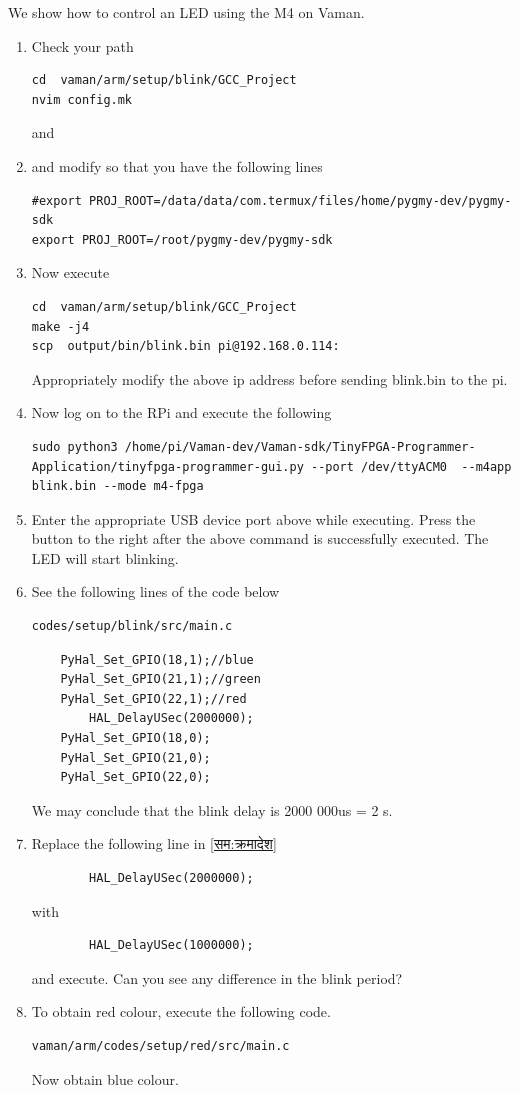 We show how to control an LED using the M4 on Vaman.
\begin{enumerate}[label=\arabic*.,ref=\theenumi]
\item Check your path
\begin{lstlisting}
cd  vaman/arm/setup/blink/GCC_Project
nvim config.mk
\end{lstlisting}
and
\item and modify so that you have the following lines
\begin{lstlisting}
#export PROJ_ROOT=/data/data/com.termux/files/home/pygmy-dev/pygmy-sdk
export PROJ_ROOT=/root/pygmy-dev/pygmy-sdk
\end{lstlisting}
\item Now execute 
\begin{lstlisting}
cd  vaman/arm/setup/blink/GCC_Project
make -j4
scp  output/bin/blink.bin pi@192.168.0.114:
\end{lstlisting}
Appropriately modify the above ip address before sending blink.bin to the pi.
\item Now log on to the RPi and execute the following
\begin{lstlisting}
sudo python3 /home/pi/Vaman-dev/Vaman-sdk/TinyFPGA-Programmer-Application/tinyfpga-programmer-gui.py --port /dev/ttyACM0  --m4app  blink.bin --mode m4-fpga
\end{lstlisting}
\item Enter the appropriate USB device port above while executing.  Press the button to the right
after the above command is successfully executed.  The LED will start blinking. 
\item See the following lines of the code below
\label{सम:क्रमादेश}
\begin{lstlisting}
codes/setup/blink/src/main.c
\end{lstlisting}
%
\begin{lstlisting}
    PyHal_Set_GPIO(18,1);//blue
    PyHal_Set_GPIO(21,1);//green
    PyHal_Set_GPIO(22,1);//red
        HAL_DelayUSec(2000000);
    PyHal_Set_GPIO(18,0);
    PyHal_Set_GPIO(21,0);
    PyHal_Set_GPIO(22,0);
\end{lstlisting}
%
We may conclude that the blink delay is 2000 000us = 2 s.
\item Replace the following line in \ref{सम:क्रमादेश}  
\label{सम:द्विआधार}
\begin{lstlisting}
        HAL_DelayUSec(2000000);
\end{lstlisting}
%
with
\begin{lstlisting}
        HAL_DelayUSec(1000000);
\end{lstlisting}
and execute.  Can you see any difference in the blink period?
\item To obtain red colour, execute the following code.
\begin{lstlisting}
vaman/arm/codes/setup/red/src/main.c
\end{lstlisting}
Now obtain blue colour.


\end{enumerate}
